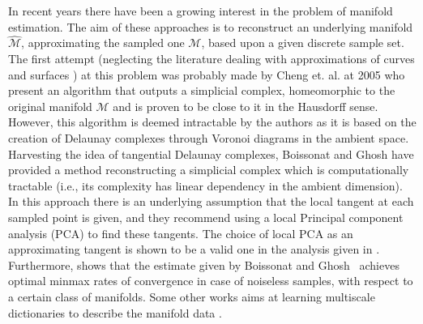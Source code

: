 \documentclass[12pt]{article}
\theoremstyle{remark}
\newcommand{\MM}{\mathcal{M}}
\begin{document}
In recent years there have been a growing interest in the problem of manifold estimation.
The aim of these approaches is to reconstruct an underlying manifold $\widehat{\MM}$, approximating the sampled one $\MM$, based upon a given discrete sample set.
The first attempt (neglecting the literature dealing with approximations of curves and surfaces \cite{dey2006curve,wendland2004scattered}) at this problem was probably made by Cheng et. al. at 2005 \cite{cheng2005manifold} who present an algorithm that outputs a simplicial complex, homeomorphic to the original manifold $\MM$ and is proven to be close to it in the Hausdorff sense.
However, this algorithm is deemed intractable by the authors as it is based on the creation of Delaunay complexes through Voronoi diagrams in the ambient space. 
Harvesting the idea of tangential Delaunay complexes, Boissonat and Ghosh \cite{boissonnat2014manifold} have provided a method reconstructing a simplicial complex which is computationally tractable (i.e., its complexity has linear dependency in the ambient dimension).
In this approach there is an underlying assumption that the local tangent at each sampled point is given, and they recommend using a local Principal component analysis (PCA) to find these tangents.
The choice of local PCA as an approximating tangent is shown to be a valid one in the analysis given in \cite{aamari2018stability,kaslovsky2011optimal,kaslovsky2014non,singer2012vector}. Furthermore, \cite{aamari2018stability} shows that the estimate given by Boissonat and Ghosh~\cite{boissonnat2014manifold} achieves optimal minmax rates of convergence in case of noiseless samples, with respect to a certain class of manifolds.
Some other works aims at learning multiscale dictionaries to describe the manifold data \cite{allard2012multi}. 
\end{document}
